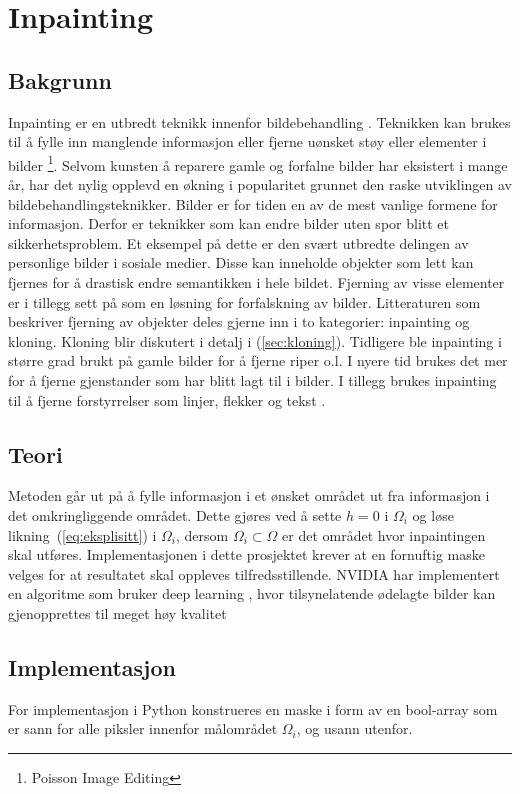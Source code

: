 \section{Inpainting}
\label{sec:Inpainting}
\subsection{Bakgrunn}
Inpainting er en utbredt teknikk innenfor bildebehandling \cite{wiki:inpainting}. Teknikken kan brukes til å fylle inn manglende informasjon eller fjerne uønsket støy eller elementer i bilder \footnote{Poisson Image Editing\cite{papers0171:online}}. Selvom kunsten å reparere gamle og forfalne bilder har eksistert i mange år, har det nylig opplevd en økning i popularitet grunnet den raske utviklingen av bildebehandlingsteknikker. Bilder er for tiden en av de mest vanlige formene for informasjon. Derfor er teknikker som kan endre bilder uten spor blitt et sikkerhetsproblem. Et eksempel på dette er den svært utbredte delingen av personlige bilder i sosiale medier. Disse kan inneholde objekter som lett kan fjernes for å drastisk endre semantikken i hele bildet. Fjerning av visse elementer er i tillegg sett på som en løsning for forfalskning av bilder. Litteraturen som beskriver fjerning av objekter deles gjerne inn i to kategorier: inpainting og kloning. Kloning blir diskutert i detalj i (\ref{sec:kloning}). Tidligere ble inpainting i større grad brukt på gamle bilder for å fjerne riper o.l. I nyere tid brukes det mer for å fjerne gjenstander som har blitt lagt til i bilder. I tillegg brukes inpainting til å fjerne forstyrrelser som linjer, flekker og tekst \cite{1909063938:online}.

\subsection{Teori}
 Metoden går ut på å fylle informasjon i et ønsket området ut fra informasjon i det omkringliggende området. Dette gjøres ved å sette $h=0$ i $\Omega_i$ og løse likning~(\ref{eq:eksplisitt}) i $\Omega_i$, dersom $\Omega_i \subset \Omega$ er det området hvor inpaintingen skal utføres. Implementasjonen i dette prosjektet krever at en fornuftig maske velges for at resultatet skal oppleves tilfredsstillende. NVIDIA har implementert en algoritme som bruker deep learning \cite{wiki:Deep_learning}, hvor tilsynelatende ødelagte bilder kan gjenopprettes til meget høy kvalitet \cite{180407722:nvidia}
 
 \subsection{Implementasjon}
 For implementasjon i Python konstrueres en maske i form av en bool-array som er sann for alle piksler innenfor målområdet $\Omega_i$, og usann utenfor.

